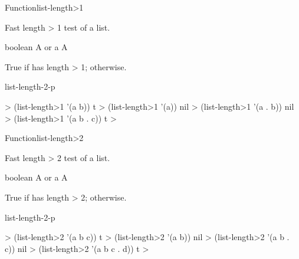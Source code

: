 \documentclass[10pt,twoside,english,pdftex]{article}
\begin{document}
\begin{functiondoc}{Function}{list-length>1}%
  {
    \returns{} }
%
%

\fnsyntax

\fnpurpose Fast length > 1 test of a list.

\fnpackage {}

\fnmodule {}

\fnargs
\begin{args}{boolean}
\arg[list] A  or a 
\arg[boolean] A 
\end{args}

\fnreturns True if  has length > 1; \nil{} otherwise.

\begin{alsos}{list-length-2-p}
\end{alsos}

\fnexamples
%
\W\supp
\begin{example}
  > (list-length>1 '(a b))
  t
  > (list-length>1 '(a))
  nil\goodpagebreak
  > (list-length>1 '(a . b))
  nil
  > (list-length>1 '(a b . c))
  t
  >
\end{example}

\end{functiondoc}


\begin{functiondoc}{Function}{list-length>2}%
  {
    \returns{} }
%
%

\fnsyntax

\fnpurpose Fast length > 2 test of a list.

\fnpackage {}

\fnmodule {}

\fnargs
\begin{args}{boolean}
\arg[list] A  or a 
\arg[boolean] A 
\end{args}

\fnreturns True if  has length > 2; \nil{} otherwise.

\begin{alsos}{list-length-2-p}
\end{alsos}

\fnexamples
%
\W\supp
\begin{example}
  > (list-length>2 '(a b c))
  t
  > (list-length>2 '(a b))
  nil\goodpagebreak
  > (list-length>2 '(a b . c))
  nil
  > (list-length>2 '(a b c . d))
  t
  >
\end{example}

\end{functiondoc}
\end{document}
